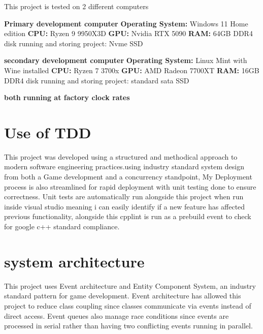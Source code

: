 \documentclass[]{final_report}
\begin{document}
This project is tested on 2 different computers

\textbf{Primary development computer } \newline
\textbf{Operating System:} Windows 11 Home edition \newline
\textbf{CPU:} Ryzen 9 9950X3D \newline
\textbf{GPU:} Nvidia RTX 5090 \newline
\textbf{RAM:} 64GB DDR4 \newline
disk running and storing project: Nvme SSD \newline

\textbf{secondary development computer} \newline
\textbf{Operating System:} Linux Mint with Wine installed \newline
\textbf{CPU:} Ryzen 7 3700x \newline
\textbf{GPU:} AMD Radeon 7700XT \newline
\textbf{RAM:} 16GB DDR4 \newline
disk running and storing project: standard sata SSD \newline

\textbf{both running at factory clock rates} \newline

\section{Use of TDD}
This project was developed using a structured and methodical approach to modern software engineering practices.using industry standard system design from both a Game development and a concurrency standpoint, My Deployment process is also streamlined for rapid deployment with unit testing done to ensure correctness. Unit tests are automatically run alongside this project when run inside visual studio meaning i can easily identify if a new feature has affected previous functionality, alongside this cpplint is run as a prebuild event to check for google c++ standard compliance.
\section{system architecture}
This project uses Event architecture and Entity Component System, an industry standard pattern for game development. Event architecture has allowed this project to reduce class coupling since classes communicate via events instead of direct access. Event queues also manage race conditions since events are processed in serial rather than having two conflicting events running in parallel. 
\end{document}
